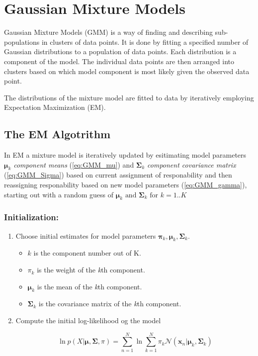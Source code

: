 \section*{Gaussian Mixture Models}
Gaussian Mixture Models (GMM) is a way of finding and describing sub-populations in clusters of data points.
It is done by fitting a specified number of Gaussian distributions to a population of data points.
Each distribution is a component of the model. 
The individual data points are then arranged into clusters based on which model component is most likely given the observed data point.

The distributions of the mixture model are fitted to data by iteratively employing Expectation Maximization (EM).

\subsection*{The EM Algotrithm}
In EM a mixture model is iteratively updated by esitimating model parameters $\bm{\mu}_k $ \emph{component means} (\ref{eq:GMM_mu}) and $ \bm{\Sigma}_k $ \emph{component covariance matrix} (\ref{eq:GMM_Sigma}) based on current assignment of responability and then reassigning responability based on new model parameters (\ref{eq:GMM_gamma}), starting out with a random guess of $\bm{\mu}_k \text{ and } \bm{\Sigma}_k \text{ for } k=1..K$ 


\subsubsection*{Initialization:}
\begin{enumerate}
\item
Choose initial estimates for model parameters $ \mathbf{\pi}_{k}, \mathbf{\mu}_{k}, \mathbf{\Sigma}_{k} $.

\begin{itemize}

	\item
	$ k $ is the component number out of K.

	\item
	$ \pi_{k} $  is the weight of the \textit{k}th component.

	\item
	$ \mathbf{\mu}_{k}$ is the mean of the \textit{k}th component.

	\item
	$ \mathbf{\Sigma}_{k} $ is the covariance matrix of the \textit{k}th component.

	\end{itemize}


\item
Compute the initial log-likelihood og the model

\begin{equation} \label{eq:loglikeGMM}
\ln p\left(X | \mathbf{\mu}, \mathbf{\Sigma}, \pi\right) = 
\sum_{n=1}^{N} \ln \sum_{k=1}^{N} \pi_{k}\mathcal{N}(\mathbf{x}_{n}|\mathbf{\mu}_{k},\mathbf{\Sigma}_{k})
\end{equation}

\end{enumerate}

